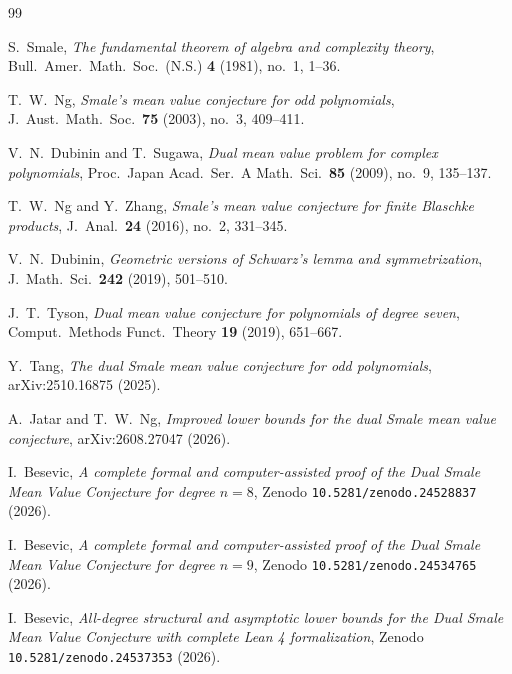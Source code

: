 \documentclass[11pt,a4paper]{article}
\theoremstyle{definition}
\theoremstyle{remark}
\begin{document}
\begin{thebibliography}{99}

S.~Smale,
\emph{The fundamental theorem of algebra and complexity theory},
Bull.\ Amer.\ Math.\ Soc.\ (N.S.) \textbf{4} (1981), no.~1, 1--36.

T.~W.~Ng,
\emph{Smale's mean value conjecture for odd polynomials},
J.\ Aust.\ Math.\ Soc.\ \textbf{75} (2003), no.~3, 409--411.

V.~N.~Dubinin and T.~Sugawa,
\emph{Dual mean value problem for complex polynomials},
Proc.\ Japan Acad.\ Ser.\ A Math.\ Sci.\ \textbf{85} (2009), no.~9, 135--137.

T.~W.~Ng and Y.~Zhang,
\emph{Smale's mean value conjecture for finite Blaschke products},
J.\ Anal.\ \textbf{24} (2016), no.~2, 331--345.

V.~N.~Dubinin,
\emph{Geometric versions of Schwarz's lemma and symmetrization},
J.\ Math.\ Sci.\ \textbf{242} (2019), 501--510.

J.~T.~Tyson,
\emph{Dual mean value conjecture for polynomials of degree seven},
Comput.\ Methods Funct.\ Theory \textbf{19} (2019), 651--667.

Y.~Tang,
\emph{The dual Smale mean value conjecture for odd polynomials},
arXiv:2510.16875 (2025).

A.~Jatar and T.~W.~Ng,
\emph{Improved lower bounds for the dual Smale mean value conjecture},
arXiv:2608.27047 (2026).

I.~Besevic,
\emph{A complete formal and computer-assisted proof of the Dual Smale Mean Value Conjecture for degree $n = 8$},
Zenodo \texttt{10.5281/zenodo.24528837} (2026).

I.~Besevic,
\emph{A complete formal and computer-assisted proof of the Dual Smale Mean Value Conjecture for degree $n = 9$},
Zenodo \texttt{10.5281/zenodo.24534765} (2026).

I.~Besevic,
\emph{All-degree structural and asymptotic lower bounds for the Dual Smale Mean Value Conjecture with complete Lean 4 formalization},
Zenodo \texttt{10.5281/zenodo.24537353} (2026).

\end{thebibliography}
\end{document}
